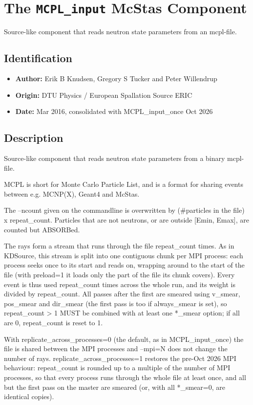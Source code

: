 \section{The \texttt{MCPL\_input} McStas Component}
Source-like component that reads neutron state parameters from an mcpl-file.

\subsection*{Identification}
\begin{itemize}
  \item \textbf{Author:} Erik B Knudsen, Gregory S Tucker and Peter Willendrup
  \item \textbf{Origin:} DTU Physics / European Spallation Source ERIC
  \item \textbf{Date:} Mar 2016, consolidated with MCPL\_input\_once Oct 2026
\end{itemize}

\subsection*{Description}
Source-like component that reads neutron state parameters from a binary mcpl-file.

MCPL is short for Monte Carlo Particle List, and is a format for sharing events between e.g. MCNP(X), Geant4 and McStas.

The --ncount given on the commandline is overwritten by (\#particles in the file) x repeat\_count. Particles that are not neutrons, or are outside [Emin, Emax], are counted but ABSORBed.

The rays form a stream that runs through the file repeat\_count times. As in KDSource, this stream is split into one contiguous chunk per MPI process: each process seeks once to its start and reads on, wrapping around to the start of the file (with preload=1 it loads only the part of the file its chunk covers). Every event is thus used repeat\_count times across the whole run, and its weight is divided by repeat\_count. All passes after the first are smeared using v\_smear, pos\_smear and dir\_smear (the first pass is too if always\_smear is set), so repeat\_count \textgreater{} 1 MUST be combined with at least one *\_smear option; if all are 0, repeat\_count is reset to 1.

With replicate\_across\_processes=0 (the default, as in MCPL\_input\_once) the file is shared between the MPI processes and --mpi=N does not change the number of rays. replicate\_across\_processes=1 restores the pre-Oct 2026 MPI behaviour: repeat\_count is rounded up to a multiple of the number of MPI processes, so that every process runs through the whole file at least once, and all but the first pass on the master are smeared (or, with all *\_smear=0, are identical copies).

